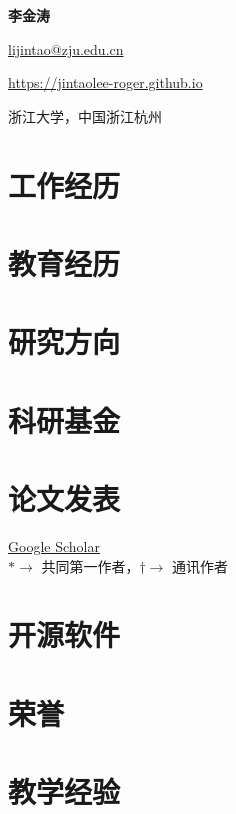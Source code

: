 \documentclass[11pt,a4paper,fontset=none]{ctexart}
\newcommand{\mytitle}[4]{%
  \begin{center}
    {\Large\bfseries #1}\par
    \href{mailto:#2}{#2}\par
    \href{#3}{#3}\par
    #4
  \end{center}}
\begin{document}
\pagestyle{plain}

\mytitle{李金涛}{lijintao@zju.edu.cn}
  {https://jintaolee-roger.github.io}
  {浙江大学，中国浙江杭州}

\RaggedRight
\setlength{\emergencystretch}{1.5em}

\section*{工作经历}


\section*{教育经历}


\section*{研究方向}


\section*{科研基金}

\section*{论文发表}
\small
\href{https://scholar.google.com/citations?user=_g2xGUwAAAAJ&hl=en}{Google Scholar}\\
$* \rightarrow$ 共同第一作者，$\dagger \rightarrow$ 通讯作者
\normalsize

\nocite{*}


\section*{开源软件}


\section*{荣誉}


\section*{教学经验}

\end{document}
